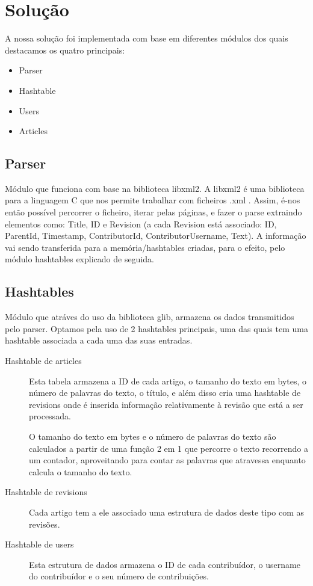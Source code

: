 \documentclass[a4paper]{article}
\begin{document}
\section{Solução}
A nossa solução foi implementada com base em diferentes módulos dos quais destacamos os quatro principais:

\begin{itemize}
    \item Parser
    \item Hashtable
    \item Users
    \item Articles
\end{itemize}
\label{sec:solucao}

\subsection{Parser}
Módulo que funciona com base na biblioteca libxml2. A libxml2 é uma biblioteca para a linguagem C que nos permite trabalhar com ficheiros .xml .
Assim, é-nos então possível percorrer o ficheiro, iterar pelas páginas, e fazer o parse extraindo elementos como: Title, ID e Revision (a cada Revision está associado: ID, ParentId, Timestamp, ContributorId, ContributorUsername, Text).
A informação vai sendo transferida para a memória/hashtables criadas, para o efeito, pelo módulo hashtables explicado de seguida.

\subsection{Hashtables}
Módulo que atráves do uso da biblioteca glib, armazena os dados transmitidos pelo parser. Optamos pela uso de 2 hashtables principais, uma das quais tem uma hashtable associada a cada uma das suas entradas.
\begin{description}
    \item[Hashtable de articles] Esta tabela armazena a ID de cada artigo, o tamanho do texto em bytes, o número de palavras do texto, o título, e além disso cria uma hashtable de revisions onde é inserida informação relativamente à revisão que está a ser processada.

    O tamanho do texto em bytes e o número de palavras do texto são calculados a partir de uma função 2 em 1 que percorre o texto recorrendo a um contador, aproveitando para contar as palavras que atravessa enquanto calcula o tamanho do texto.

    \item[Hashtable de revisions] Cada artigo tem a ele associado uma estrutura de dados deste tipo com as revisões.

    \item[Hashtable de users] Esta estrutura de dados armazena o ID de cada contribuídor, o username do contribuídor e o seu número de contribuições.

\end{description}
\end{document}
